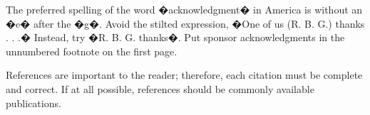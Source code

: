 \documentclass[letterpaper, 10 pt, conference]{ieeeconf}  %
\begin{document}
The preferred spelling of the word �acknowledgment� in America is without an �e� after the �g�. Avoid the stilted expression, �One of us (R. B. G.) thanks . . .�  Instead, try �R. B. G. thanks�. Put sponsor acknowledgments in the unnumbered footnote on the first page.




References are important to the reader; therefore, each citation must be complete and correct. If at all possible, references should be commonly available publications.


\end{document}
